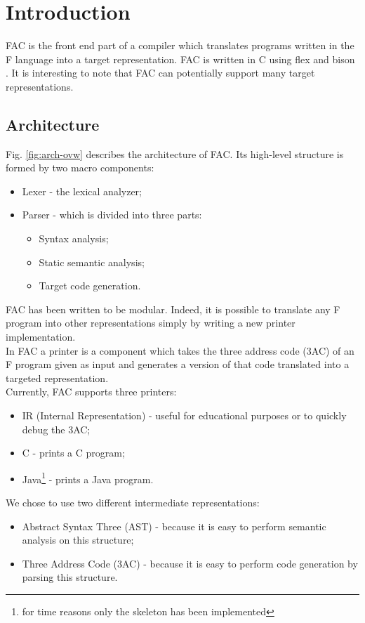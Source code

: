 \section*{Introduction}

FAC is the front end part of a compiler which translates programs written in the
F language into a target representation. FAC is written in C using
flex \cite{flex-online} and bison \cite{bison-online}.
It is interesting to note that FAC can potentially support many target
representations.

\subsection*{Architecture}
Fig. \ref{fig:arch-ovw} describes the architecture of FAC.
Its high-level structure is formed by two macro components:
\begin{itemize}
\item Lexer - the lexical analyzer;
\item Parser - which is divided into three parts:
\begin{itemize}
	\item Syntax analysis;
	\item Static semantic analysis;
	\item Target code generation.
\end{itemize}
\end{itemize}

FAC has been written to be modular. Indeed, it is possible to translate any F
program into other representations simply by writing a new printer implementation.
\\
In FAC a printer is a component which takes the three address code (3AC) of an F
program given as input and generates a version of that code translated into a targeted
representation.
\\
Currently, FAC supports three printers:
\begin{itemize}
\item IR (Internal Representation) - useful for educational purposes or to quickly debug the 3AC;
\item C - prints a C program;
\item Java\footnote{for time reasons only the skeleton has been implemented} - prints a Java program.
\end{itemize}

We chose to use two different intermediate representations:
\begin{itemize}
\item Abstract Syntax Three (AST) - because it is easy to perform semantic analysis on this structure;
\item Three Address Code (3AC) - because it is easy to perform code generation by parsing this structure.
\end{itemize}

